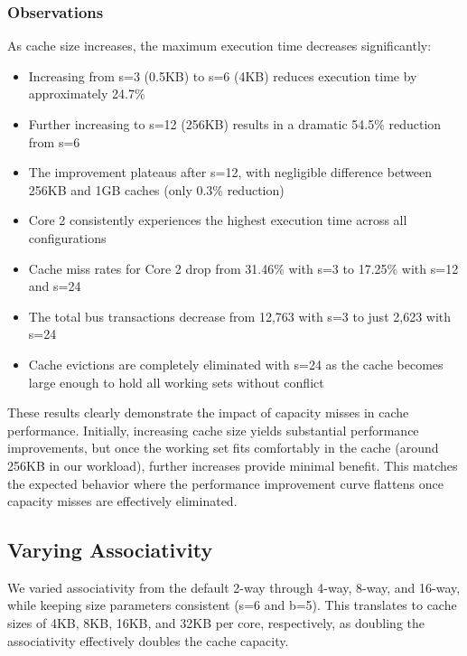 \documentclass[11pt,a4paper]{article}
\begin{document}
    \subsubsection{Observations}
    As cache size increases, the maximum execution time decreases significantly:
    \begin{itemize}[leftmargin=*]
        \item Increasing from s=3 (0.5KB) to s=6 (4KB) reduces execution time by approximately 24.7\%
        \item Further increasing to s=12 (256KB) results in a dramatic 54.5\% reduction from s=6
        \item The improvement plateaus after s=12, with negligible difference between 256KB and 1GB caches (only 0.3\% reduction)
        \item Core 2 consistently experiences the highest execution time across all configurations
        \item Cache miss rates for Core 2 drop from 31.46\% with s=3 to 17.25\% with s=12 and s=24
        \item The total bus transactions decrease from 12,763 with s=3 to just 2,623 with s=24
        \item Cache evictions are completely eliminated with s=24 as the cache becomes large enough to hold all working sets without conflict
    \end{itemize}

    These results clearly demonstrate the impact of capacity misses in cache performance. Initially, increasing cache size yields substantial performance improvements, but once the working set fits comfortably in the cache (around 256KB in our workload), further increases provide minimal benefit. This matches the expected behavior where the performance improvement curve flattens once capacity misses are effectively eliminated.

    \subsection{Varying Associativity}

    We varied associativity from the default 2-way through 4-way, 8-way, and 16-way, while keeping size parameters consistent (s=6 and b=5). This translates to cache sizes of 4KB, 8KB, 16KB, and 32KB per core, respectively, as doubling the associativity effectively doubles the cache capacity.
\end{document}
